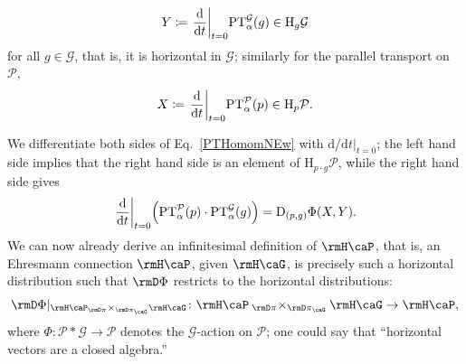 \documentclass[reqno,a4paper,oneside]{amsart}
\newcommand\fibtimes[2]{\mathbin{_{#1}\times_{#2}}}
\theoremstyle{plain}
\theoremstyle{remark}
\theoremstyle{definition}
\begin{document}
\begin{equation*}
Y
\coloneqq
\mleft.\frac{\mathrm{d}}{\mathrm{d}t}\mright|_{t=0} \mathrm{PT}_\alpha^{\mathcal{G}}(g)
\in
\mathrm{H}_g\mathcal{G}
\end{equation*}
for all $g \in \mathcal{G}$, that is, it is horizontal in $\mathcal{G}$; similarly for the parallel transport on $\mathcal{P}$,
\begin{equation*}
X
\coloneqq
\mleft.\frac{\mathrm{d}}{\mathrm{d}t}\mright|_{t=0} \mathrm{PT}_\alpha^{\mathcal{P}}(p)
\in
\mathrm{H}_p\mathcal{P}.
\end{equation*}

We differentiate both sides of Eq.\ \eqref{PTHomomNEw} with $\mathrm{d}/\mathrm{d}t|_{t=0}$; the left hand side implies that the right hand side is an element of $\mathrm{H}_{p\cdot g}\mathcal{P}$, while the right hand side gives
\begin{equation*}
\mleft.\frac{\mathrm{d}}{\mathrm{d}t}\mright|_{t=0} \mleft(
	\mathrm{PT}_\alpha^{\mathcal{P}}(p) \cdot \mathrm{PT}_\alpha^{\mathcal{G}}(g)
\mright)
=
\mathrm{D}_{(p, g)}\Phi\mleft(
	X, 
	Y
\mright).
\end{equation*}
We can now already derive an infinitesimal definition of $\rmH\caP$, that is, an Ehresmann connection $\rmH\caP$, given $\rmH \caG$, is precisely such a horizontal distribution such that $\rmD \Phi$ restricts to the horizontal distributions:
\begin{equation*}
\rmD \Phi|_{\rmH\caP \fibtimes{\rmD\pi}{\rmD\pi_\caG} \rmH\caG} \colon 
\rmH\caP \fibtimes{\rmD\pi}{\rmD\pi_\caG} \rmH\caG \to \rmH \caP,
\end{equation*}
where $\Phi\colon \mathcal{P}* \mathcal{G} \to \mathcal{P}$ denotes the $\mathcal{G}$-action on $\mathcal{P}$;
one could say that ``horizontal vectors are a closed algebra.''
\end{document}
